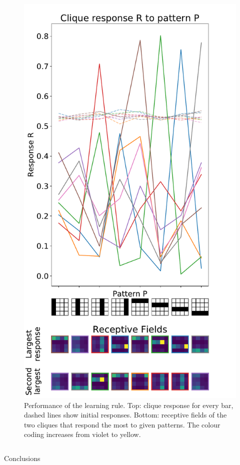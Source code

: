 \documentclass[final,hyperref={pdfpagelabels=false}]{beamer}
\begin{document}
\begin{frame}
\begin{columns}
\begin{column}{.60\textwidth}
\begin{minipage}[T]{.95\textwidth}
{\begin{minipage}[T]{.45\textwidth}
\begin{column}[T]{1\textwidth}
\begin{figure}
						\includegraphics[width=.89\textwidth]{double_complete_tall.pdf}
						\caption{{\color{black}Performance of the learning rule. Top: clique response for every bar, dashed lines show initial responses. Bottom: receptive fields of the two cliques that respond the most to given patterns. The colour coding increases from violet	to yellow.}}
						\label{fig:complete}
					\end{figure}
				\end{column}
			\end{minipage}
			\vfill
			\vspace{1\baselineskip}
			\begin{emphblock}{Conclusions}

\end{emphblock}}
\end{minipage}
\end{column}
\end{columns}
\end{frame}
\end{document}
